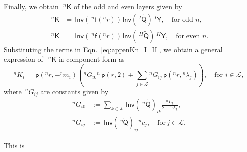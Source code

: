 \documentclass[preprint,10pt,times]{elsarticle}
\numberwithin{equation}{section}
\renewcommand{\u}[1]{\boldsymbol{#1}}
\newcommand{\usf}[1]{\u{\mathsf #1}}
\newcommand{\pr}[1]{\left( #1 \right)}
\newcommand{\p}{\,\mathsf{p}}
\newcommand{\Inv}{\,\mathsf{Inv}}
\renewcommand{\>}{$\Rightarrow$}
\begin{document}
Finally, we obtain~$~^{n}{\usf{K}}$ of the odd and even layers given by
\begin{subequations}
\begin{align}
	~^{n}{\usf{K}} & = \Inv\pr{~^{n}\usf{f}({}^{n}\!r)} \Inv\pr{~^{I}\tilde{\usf{Q}}}~^{I}\usf{Y}, \quad \text{for odd~$n$}, \\
	~^{n}{\usf{K}} & = \Inv\pr{~^{n}\usf{f}({}^{n}\!r)} \Inv\pr{~^{II}\tilde{\usf{Q}}}~^{II}\usf{Y}, \quad \text{for even~$n$}.
\end{align}
\label{eq:appenKn_I_II}
\end{subequations}
Substituting the terms in Eqn.~\eqref{eq:appenKn_I_II}, we obtain a general expression of~$~^{n}{\usf{K}}$ in component form as
\begin{equation}
{}^{n}\!{K_{i}} = \p\pr{{}^{n}\!{r},-{}^{n}\!{m_{i}}} \left( {}^{n}\!G_{i0} {}^{n} \p\pr{r,2} + \sum_{j \in \mathcal{L}} {}^{n}\!G_{ij} \p\pr{{}^{n}r,{}^{n}\!{\lambda_{j}}} \right) , \quad \text{for~$i \in \mathcal{L}$},
\label{eq:appenKn}
\end{equation}
where~${}^{n}\!G_{ij}$ are constants given by
\begin{subequations}
\begin{align}
	{}^{n}\!G_{i0}& := \sum_{k \in \mathcal{L}} \Inv\pr{~^{n}\tilde{\usf{Q}}}_{ik} \frac{{}^{n}\!L_{k}}{2 - {}^{n}\!\lambda_{k}}, \\
	{}^{n}\!G_{ij}& := \Inv\pr{~^{n}\tilde{\usf{Q}}}_{ij} {}^{n}\!c_{j}, \quad \text{for}\, j\in \mathcal{L} .
\end{align}
\label{eq:Gjin}
\end{subequations}

\newpage



This is 
\end{document}
